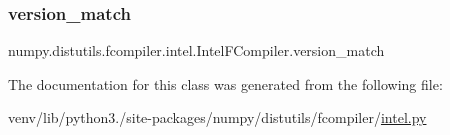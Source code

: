 \subsubsection{\texorpdfstring{version\+\_\+match}{version\_match}}
{\footnotesize\ttfamily numpy.\+distutils.\+fcompiler.\+intel.\+Intel\+F\+Compiler.\+version\+\_\+match\hspace{0.3cm}{\ttfamily [static]}}



The documentation for this class was generated from the following file\+:\begin{DoxyCompactItemize}
\item 
venv/lib/python3./site-\/packages/numpy/distutils/fcompiler/\hyperlink{intel_8py}{intel.\+py}\end{DoxyCompactItemize}
